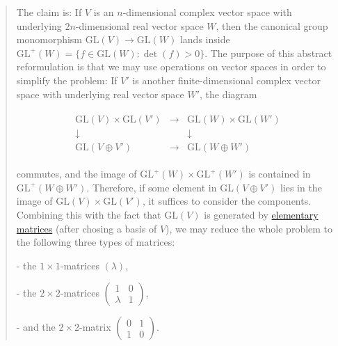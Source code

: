 \documentclass{article}
\numberwithin{equation}{subsection} %
\theoremstyle{definition}
\begin{document}
        \begin{quote}
            The claim is: If $V$ is an $n$-dimensional complex vector space with underlying $2n$-dimensional real vector space $W$, then the canonical group monomorphism $\mathrm{GL}(V) \to \mathrm{GL}(W)$ lands inside $\mathrm{GL}^+(W)=\{f \in \mathrm{GL}(W) : \det(f)>0\}$.  The purpose of this abstract reformulation is that we may use operations on vector spaces in order to simplify the problem: If $V'$ is another finite-dimensional complex vector space with underlying real vector space $W'$, the diagram

            \begin{align}
              \begin{array}{ccc} 
                \mathrm{GL}(V) \times \mathrm{GL}(V') & \rightarrow & \mathrm{GL}(W) \times \mathrm{GL}(W') \\
                \downarrow & & \downarrow \\ 
                \mathrm{GL}(V \oplus V') & \rightarrow & \mathrm{GL}(W \oplus W') 
              \end{array}
            \end{align}

            commutes, and the image of $\mathrm{GL}^+(W) \times \mathrm{GL}^+(W')$  is contained in $\mathrm{GL}^+(W \oplus W')$. Therefore, if some element in $\mathrm{GL}(V \oplus V')$ lies in the image of $\mathrm{GL}(V) \times \mathrm{GL}(V')$, it suffices to consider the components. Combining this with the fact that $\mathrm{GL}(V)$ is generated by \href{https://en.wikipedia.org/wiki/Elementary_matrix}{elementary matrices} (after chosing a basis of $V$), we may reduce the whole problem to the following three types of matrices:

            - the $1 \times 1$-matrices $(\lambda)$,

            - the $2 \times 2$-matrices $\begin{pmatrix} 1 & 0 \\ \lambda & 1 \end{pmatrix}$,

            - and the $2 \times 2$-matrix $\begin{pmatrix} 0 & 1 \\ 1 & 0 \end{pmatrix}$.


\end{quote}
\end{document}

